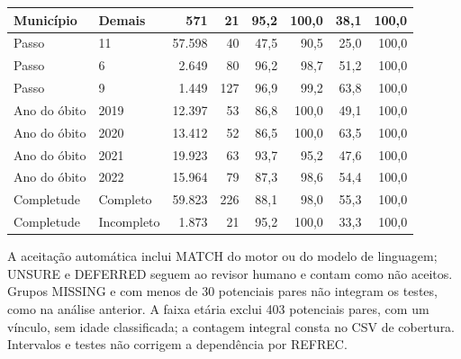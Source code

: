 \begin{table}[htbp]
{\begin{tabular}{llrrrrrr}
Munic\'ipio & Demais & 571 & 21 & 95{,}2 & 100{,}0 & 38{,}1 & 100{,}0 \\
\midrule
Passo & 11 & 57.598 & 40 & 47{,}5 & 90{,}5 & 25{,}0 & 100{,}0 \\
Passo & 6 & 2.649 & 80 & 96{,}2 & 98{,}7 & 51{,}2 & 100{,}0 \\
Passo & 9 & 1.449 & 127 & 96{,}9 & 99{,}2 & 63{,}8 & 100{,}0 \\
\midrule
Ano do \'obito & 2019 & 12.397 & 53 & 86{,}8 & 100{,}0 & 49{,}1 & 100{,}0 \\
Ano do \'obito & 2020 & 13.412 & 52 & 86{,}5 & 100{,}0 & 63{,}5 & 100{,}0 \\
Ano do \'obito & 2021 & 19.923 & 63 & 93{,}7 & 95{,}2 & 47{,}6 & 100{,}0 \\
Ano do \'obito & 2022 & 15.964 & 79 & 87{,}3 & 98{,}6 & 54{,}4 & 100{,}0 \\
\midrule
Completude & Completo & 59.823 & 226 & 88{,}1 & 98{,}0 & 55{,}3 & 100{,}0 \\
Completude & Incompleto & 1.873 & 21 & 95{,}2 & 100{,}0 & 33{,}3 & 100{,}0 \\
\bottomrule
\end{tabular}}
\par\smallskip\begin{minipage}{\linewidth}\footnotesize A aceitação automática inclui MATCH do motor ou do modelo de linguagem; UNSURE e DEFERRED seguem ao revisor humano e contam como não aceitos. Grupos MISSING e com menos de 30 potenciais pares não integram os testes, como na análise anterior. A faixa etária exclui 403 potenciais pares, com um vínculo, sem idade classificada; a contagem integral consta no CSV de cobertura. Intervalos e testes não corrigem a dependência por REFREC.\end{minipage}\end{table}
